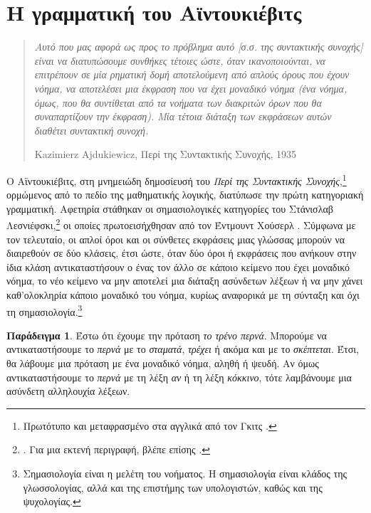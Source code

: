 \documentclass [a4paper,11pt] {book}
\theoremstyle{definition}
\newtheorem{example}[theorem]{Παράδειγμα}
\theoremstyle{definition}
\begin{document}
\section{Η γραμματική του Αϊντουκιέβιτς}
\label{sec:AdjukiewiczCG}
\begin{quote}\itshape
Αυτό που μας αφορά ως προς το πρόβλημα αυτό [σ.σ. της συντακτικής συνοχής] είναι να διατυπώσουμε συνθήκες τέτοιες ώστε, όταν ικανοποιούνται, να επιτρέπουν σε μία ρηματική δομή αποτελούμενη από απλούς όρους που έχουν νόημα, να αποτελέσει μια έκφραση που να έχει μοναδικό νόημα (ένα νόημα, όμως, που θα συντίθεται από τα νοήματα των διακριτών όρων που θα συναπαρτίζουν την έκφραση). Μία τέτοια διάταξη των εκφράσεων αυτών διαθέτει συντακτική συνοχή.
\begin{flushright}
Kazimierz Ajdukiewicz, Περί της Συντακτικής Συνοχής, 1935
\end{flushright}
\end{quote}
Ο Αϊντουκιέβιτς, στη μνημειώδη δημοσίευσή του \textit{Περί της Συντακτικής Συνοχής},\footnote{Πρωτότυπο \citep{citeulike:5026071} και μεταφρασμένο στα αγγλικά από τον Γκιτς \citep{Ajdukiewicz1967-AJDOSC}.} ορμώμενος από το πεδίο της μαθηματικής λογικής, διατύπωσε την πρώτη κατηγοριακή γραμματική. Αφετηρία στάθηκαν οι σημασιολογικές κατηγορίες του Στάνισλαβ Λεσνιέφσκι,\footnote{\citet{leśniewski1929grundzüge}. Για μια εκτενή περιγραφή, βλέπε επίσης \citep{blanc1991lesniewski}.} οι οποίες πρωτοεισήχθησαν από τον Έντμουντ Χούσερλ \citep{nla.cat-vn1181375}. Σύμφωνα με τον τελευταίο, οι απλοί όροι και οι σύνθετες εκφράσεις μιας γλώσσας μπορούν να διαιρεθούν σε δύο κλάσεις, έτσι ώστε, όταν δύο όροι ή εκφράσεις που ανήκουν στην ίδια κλάση αντικαταστήσουν ο ένας τον άλλο σε κάποιο κείμενο που έχει μοναδικό νόημα, το νέο κείμενο να μην αποτελεί μια διάταξη ασύνδετων λέξεων ή να μην χάνει καθ'ολοκληρία κάποιο μοναδικό του νόημα, κυρίως αναφορικά με τη σύνταξη και όχι τη σημασιολογία.\footnote{Σημασιολογία είναι η μελέτη του νοήματος. Η σημασιολογία είναι κλάδος της γλωσσολογίας, αλλά και της επιστήμης των υπολογιστών, καθώς και της ψυχολογίας.}
\begin{example}
\label{uniqueMeaning}
Έστω ότι έχουμε την πρόταση \textit{το τρένο περνά}. Μπορούμε να αντικαταστήσουμε το \textit{περνά} με το \textit{σταματά}, \textit{τρέχει} ή ακόμα και με το \textit{σκέπτεται}. Έτσι, θα λάβουμε μια πρόταση με ένα μοναδικό νόημα, αληθή ή ψευδή. Αν όμως αντικαταστήσουμε το \textit{περνά} με τη λέξη \textit{αν} ή τη λέξη \textit{κόκκινο}, τότε λαμβάνουμε μια ασύνδετη αλληλουχία λέξεων.
\end{example}
\end{document}
